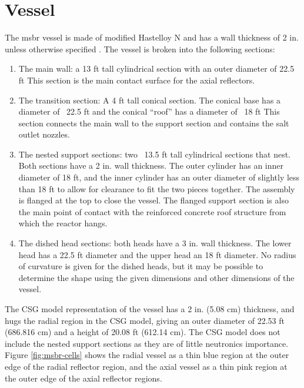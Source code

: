 \section{Vessel}
\label{sec:msbr-vessel}
The \Gls{msbr} vessel is made of modified Hastelloy N and has a wall thickness
of 2 in. unless otherwise specified \cite{robertson_conceptual_1971}. The vessel
is broken into the following sections:
\begin{enumerate}
    \item The main wall: a 13 ft tall cylindrical section with an outer
    diameter of 22.5 ft This section is the main contact surface for the axial
    reflectors.
    \item The transition section: A 4 ft tall conical section. The conical base
    has a diameter of ~22.5 ft and the conical ``roof'' has a diameter of ~18
    ft This section connects the main wall to the support section and contains
    the salt outlet nozzles.
    \item The nested support sections: two ~13.5 ft tall cylindrical sections
    that nest. Both sections have a 2 in. wall thickness. The outer cylinder has
    an inner diameter of 18 ft, and the inner cylinder has an outer diameter of
    slightly less than 18 ft to allow for clearance to fit the two pieces
    together. The assembly is flanged at the top to close the vessel. The
    flanged support section is also the main point of contact with the
    reinforced concrete roof structure from which the reactor hangs.
    \item The dished head sections: both heads have a 3 in. wall thickness. The
    lower head has a 22.5 ft diameter and the upper head an 18 ft diameter. No
    radius of curvature is given for the dished heads, but it may be possible to
    determine the shape using the given dimensions and other dimensions of the
    vessel.
\end{enumerate}

The CSG model representation of the vessel has a 2 in. (5.08
\unit{\centi\metre}) thickness, and hugs the radial region in the CSG model,
giving an outer diameter of 22.53 ft (686.816 \unit{\centi\metre}) and a
height of 20.08 ft (612.14 \unit{\centi\metre}). The CSG model does not include
the nested support sections as they are of little neutronics importance. Figure
\ref{fig:msbr-cells} shows the radial vessel as a thin blue region at the outer
edge of the radial reflector region, and the axial vessel as a thin pink region
at the outer edge of the axial reflector regions.

